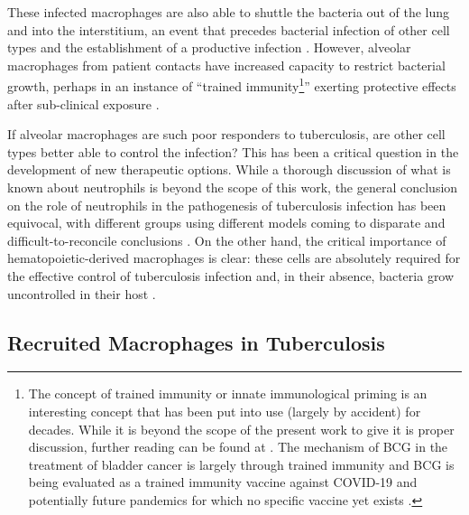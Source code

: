 These infected macrophages are also able to shuttle the bacteria out of the lung and into the interstitium, an event that precedes bacterial infection of other cell types and the establishment of a productive infection \citep{Cohen2018}. However, alveolar macrophages from patient contacts have increased capacity to restrict bacterial growth, perhaps in an instance of ``trained immunity\footnote{The concept of trained immunity or innate immunological priming is an interesting concept that has been put into use (largely by accident) for decades. While it is beyond the scope of the present work to give it is proper discussion, further reading can be found at \citep{Moorlag2020, Khan2020, Netea2020, Kaufmann2022, Katzmarski2021, Katzmarski2022}. The mechanism of BCG in the treatment of bladder cancer is largely through trained immunity \citep{RedelmanSidi2014} and BCG is being evaluated as a trained immunity vaccine against COVID\hyp{}19 and potentially future pandemics for which no specific vaccine yet exists \citep{RedelmanSidi2020}.}'' exerting protective effects after sub\hyp{}clinical exposure \citep{Carranza2006, Divangahi2021}. 

If alveolar macrophages are such poor responders to tuberculosis, are other cell types better able to control the infection? This has been a critical question in the development of new therapeutic options. While a thorough discussion of what is known about neutrophils is beyond the scope of this work, the general conclusion on the role of neutrophils in the pathogenesis of tuberculosis infection has been equivocal, with different groups using different models coming to disparate and difficult\hyp{}to\hyp{}reconcile conclusions \citep{Fortune2007, Yang2012, Srivastava2014}. On the other hand, the critical importance of hematopoietic\hyp{}derived macrophages is clear: these cells are absolutely required for the effective control of tuberculosis infection and, in their absence, bacteria grow uncontrolled in their host \citep{Pagan2015, Matty2019, Clay2007}. 

\subsection{Recruited Macrophages in Tuberculosis}\label{recmac}

